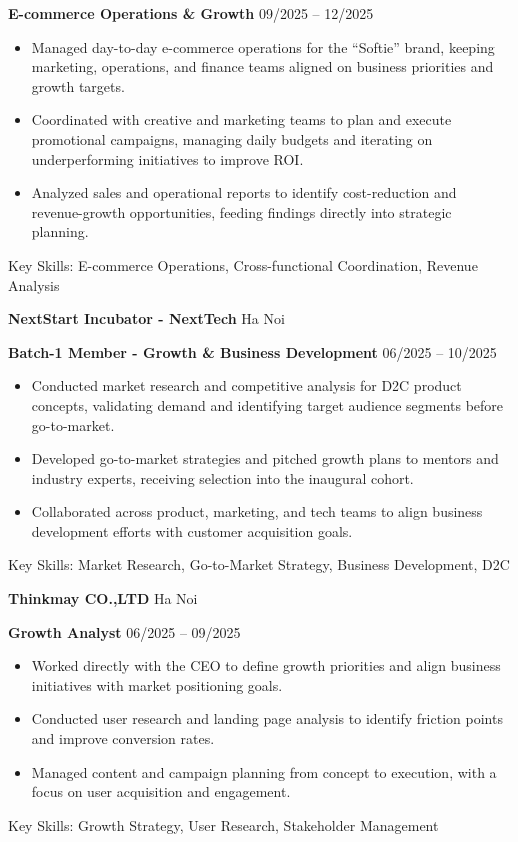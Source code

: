 \documentclass[11pt]{article}
\begin{document}
\textbf{E-commerce Operations \& Growth} \hfill 09/2025 -- 12/2025
\begin{itemize}[noitemsep, topsep=0pt, partopsep=0pt, parsep=0pt]
    \item Managed day-to-day e-commerce operations for the ``Softie'' brand, keeping marketing, operations, and finance teams aligned on business priorities and growth targets.
    \item Coordinated with creative and marketing teams to plan and execute promotional campaigns, managing daily budgets and iterating on underperforming initiatives to improve ROI.
    \item Analyzed sales and operational reports to identify cost-reduction and revenue-growth opportunities, feeding findings directly into strategic planning.
\end{itemize}
Key Skills: E-commerce Operations, Cross-functional Coordination, Revenue Analysis

\vspace{12pt}

\textbf{NextStart Incubator - NextTech} \hfill Ha Noi

\textbf{Batch-1 Member - Growth \& Business Development} \hfill 06/2025 -- 10/2025
\begin{itemize}[noitemsep, topsep=0pt, partopsep=0pt, parsep=0pt]
    \item Conducted market research and competitive analysis for D2C product concepts, validating demand and identifying target audience segments before go-to-market.
    \item Developed go-to-market strategies and pitched growth plans to mentors and industry experts, receiving selection into the inaugural cohort.
    \item Collaborated across product, marketing, and tech teams to align business development efforts with customer acquisition goals.
\end{itemize}
Key Skills: Market Research, Go-to-Market Strategy, Business Development, D2C

\vspace{12pt}

\textbf{Thinkmay CO.,LTD} \hfill Ha Noi

\textbf{Growth Analyst} \hfill 06/2025 -- 09/2025
\begin{itemize}[noitemsep, topsep=0pt, partopsep=0pt, parsep=0pt]
    \item Worked directly with the CEO to define growth priorities and align business initiatives with market positioning goals.
    \item Conducted user research and landing page analysis to identify friction points and improve conversion rates.
    \item Managed content and campaign planning from concept to execution, with a focus on user acquisition and engagement.
\end{itemize}
Key Skills: Growth Strategy, User Research, Stakeholder Management
\end{document}

